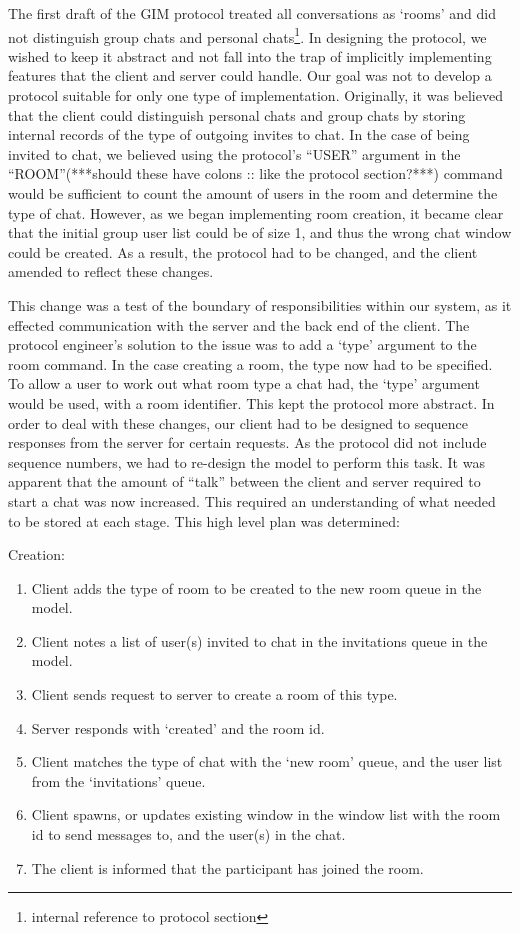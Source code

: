 The first draft of the GIM protocol treated all conversations as `rooms' and did not distinguish group chats and personal chats\footnote{internal reference to protocol section}. In designing the protocol, we wished to keep it abstract and not fall into the trap of implicitly implementing features that the client and server could handle. Our goal was not to develop a protocol suitable for only one type of implementation. Originally, it was believed that the client could distinguish personal chats and group chats by storing internal records of the type of outgoing invites to chat. In the case of being invited to chat, we believed using the protocol's ``USER'' argument in the ``ROOM''(***should these have colons :: like the protocol section?***) command would be sufficient to count the amount of users in the room and determine the type of chat. However, as we began implementing room creation, it became clear that the initial group user list could be of size 1, and thus the wrong chat window could be created. As a result, the protocol had to be changed, and the client amended to reflect these changes. 

This change was a test of the boundary of responsibilities within our system, as it effected communication with the server and the back end of the client. The protocol engineer's solution to the issue was to add a `type' argument to the room command. In the case creating a room, the type now had to be specified. To allow a user to work out what room type a chat had, the `type' argument would be used, with a room identifier. This kept the protocol more abstract. In order to deal with these changes, our client had to be designed to sequence responses from the server for certain requests. As the protocol did not include sequence numbers, we had to re-design the model to perform this task. It was apparent that the amount of ``talk'' between the client and server required to start a chat was now increased. This required an understanding of what needed to be stored at each stage. This high level plan was determined:

Creation:
\begin{enumerate}
\item Client adds the type of room to be created to the new room queue in the model.
\item Client notes a list of user(s) invited to chat in the invitations queue in the model.
\item Client sends request to server to create a room of this type.
\item Server responds with `created' and the room id.
\item Client matches the type of chat with the `new room' queue, and the user list from the `invitations' queue.
\item Client spawns, or updates existing window in the window list with the room id to send messages to, and the user(s) in the chat.
\item The client is informed that the participant has joined the room.
\end{enumerate}%

